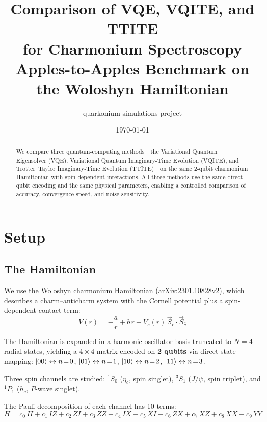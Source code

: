 \documentclass[11pt,a4paper]{article}
\title{Comparison of VQE, VQITE, and TTITE\\
  for Charmonium Spectroscopy\\[0.5em]
  \large Apples-to-Apples Benchmark on the Woloshyn Hamiltonian}
\author{quarkonium-simulations project}
\date{\today}
\begin{document}
\maketitle

\begin{abstract}
We compare three quantum-computing methods---the Variational Quantum
Eigensolver (VQE), Variational Quantum Imaginary-Time Evolution (VQITE),
and Trotter--Taylor Imaginary-Time Evolution (TTITE)---on the same
2-qubit charmonium Hamiltonian with spin-dependent interactions.
All three methods use the same direct qubit encoding and the same
physical parameters, enabling a controlled comparison of accuracy,
convergence speed, and noise sensitivity.
\end{abstract}

\tableofcontents
\newpage

\section{Setup}

\subsection{The Hamiltonian}

We use the Woloshyn charmonium Hamiltonian (arXiv:2301.10828v2), which
describes a charm--anticharm system with the Cornell potential plus a
spin-dependent contact term:
\begin{equation}
  V(r) = -\frac{a}{r} + b\,r + V_s(r)\,\vec{S}_c \cdot \vec{S}_{\bar{c}}
\end{equation}

The Hamiltonian is expanded in a harmonic oscillator basis truncated
to $N=4$ radial states, yielding a $4 \times 4$ matrix encoded on
\textbf{2 qubits} via direct state mapping:
$\ket{00} \leftrightarrow n\!=\!0$,
$\ket{01} \leftrightarrow n\!=\!1$,
$\ket{10} \leftrightarrow n\!=\!2$,
$\ket{11} \leftrightarrow n\!=\!3$.

Three spin channels are studied:
${}^1S_0$ ($\eta_c$, spin singlet),
${}^3S_1$ ($J/\psi$, spin triplet), and
${}^1P_1$ ($h_c$, $P$-wave singlet).

The Pauli decomposition of each channel has 10 terms:
\begin{equation}
  H = c_0\,II + c_1\,IZ + c_2\,ZI + c_3\,ZZ + c_4\,IX + c_5\,XI
    + c_6\,ZX + c_7\,XZ + c_8\,XX + c_9\,YY
\end{equation}
\end{document}
